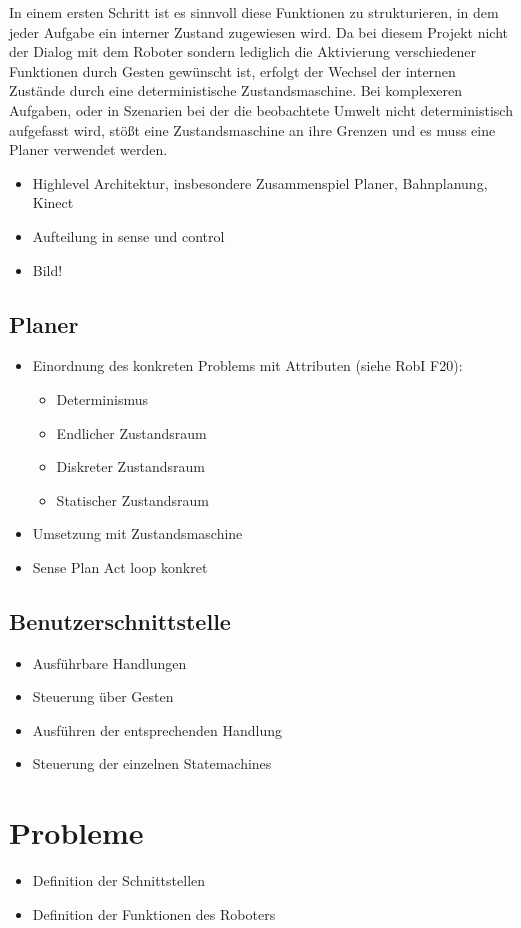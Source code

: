 In einem ersten Schritt ist es sinnvoll diese Funktionen zu strukturieren, in dem jeder Aufgabe ein interner Zustand zugewiesen wird. Da bei diesem Projekt nicht der Dialog mit dem Roboter sondern lediglich die Aktivierung verschiedener Funktionen durch Gesten gewünscht ist, erfolgt der Wechsel der internen Zustände durch eine deterministische Zustandsmaschine. Bei komplexeren Aufgaben, oder in Szenarien bei der die beobachtete Umwelt nicht deterministisch aufgefasst wird, stößt eine Zustandsmaschine an ihre Grenzen und es muss eine Planer verwendet werden.

 
\begin{itemize}
\item Highlevel Architektur, insbesondere Zusammenspiel Planer, Bahnplanung, Kinect
\item Aufteilung in sense und control
\item Bild!
\end{itemize}

\subsection{Planer}
\label{planer_integration_sec}

\begin{itemize}
\item Einordnung des konkreten Problems mit Attributen (siehe RobI F20):
\begin{itemize}
\item Determinismus
\item Endlicher Zustandsraum
\item Diskreter Zustandsraum
\item Statischer Zustandsraum
\end{itemize}
\item Umsetzung mit Zustandsmaschine
\item Sense Plan Act loop konkret
\end{itemize}

\subsection{Benutzerschnittstelle}
\label{benutzerschnittstelle_integration_cha}

\begin{itemize}
\item Ausführbare Handlungen
\item Steuerung über Gesten
\item Ausführen der entsprechenden Handlung
\item Steuerung der einzelnen Statemachines
\end{itemize}

\section{Probleme}
\label{probleme_integration_sec}

\begin{itemize}
\item Definition der Schnittstellen
\item Definition der Funktionen des Roboters
\end{itemize}
